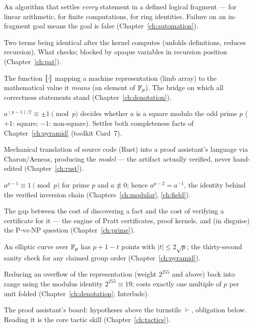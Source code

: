 An algorithm that settles \emph{every}
statement in a defined logical fragment ---  for linear
arithmetic,  for finite computations,  for
ring identities. Failure on an in-fragment goal means the goal is
false (Chapter~\ref{ch:automation}).

 Two terms being identical after the
kernel computes (unfolds definitions, reduces recursion). What
 checks; blocked by opaque variables in recursion position
(Chapter~\ref{ch:pat}).

 The function $[\mkern-3.3mu[ \cdot ]\mkern-3.3mu]$ mapping a machine
representation (limb array) to the mathematical value it \emph{means}
(an element of $\mathbb{F}_p$). The bridge on which all correctness statements
stand (Chapter~\ref{ch:denotation}).

 $a^{(p-1)/2} \equiv \pm 1 \pmod p$ decides
whether $a$ is a square modulo the odd prime $p$ ($+1$: square; $-1$:
non-square). Settles both completeness facts of
Chapter~\ref{ch:pyramid} (toolkit Card~7).

 Mechanical translation of source code (Rust) into a
proof assistant's language via Charon/Aeneas, producing the \emph{model}
--- the artifact actually verified, never hand-edited
(Chapter~\ref{ch:rust}).

 $a^{p-1} \equiv 1 \pmod p$ for prime
$p$ and $a \not\equiv 0$; hence $a^{p-2} = a^{-1}$, the identity behind
the verified inversion chain (Chapters~\ref{ch:modular},
\ref{ch:field}).

 The gap between the cost of discovering a
fact and the cost of verifying a certificate for it --- the engine of
Pratt certificates, proof kernels, and (in disguise) the P-vs-NP
question (Chapter~\ref{ch:prime}).

 An elliptic curve over $\mathbb{F}_p$ has $p + 1 - t$ points
with $|t| \le 2\sqrt{p}$; the thirty-second sanity check for any
claimed group order (Chapter~\ref{ch:pyramid}).

 Reducing an overflow of the representation (weight
$2^{255}$ and above) back into range using the modulus identity
$2^{255} \equiv 19$; costs exactly one multiple of $p$ per unit folded
(Chapter~\ref{ch:denotation}; Interlude).

 The proof assistant's board: hypotheses above the
turnstile $\vdash$, obligation below. Reading it is the core tactic
skill (Chapter~\ref{ch:tactics}).

